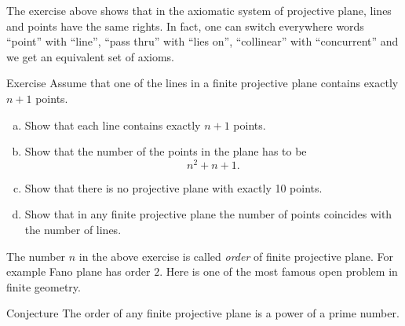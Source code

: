 The exercise above shows that in the axiomatic system of projective plane,
lines and points have the same rights.
In fact, one can switch everywhere words ``point'' with ``line'', ``pass thru'' with ``lies on'', ``collinear'' with ``concurrent'' and we get an equivalent set of axioms.

\begin{thm}{Exercise}\label{ex:oder}
Assume that one of the lines in a finite projective plane contains exactly $n+1$ points.
\begin{enumerate}[(a)]
\item\label{ex:oder:a} Show that each line contains exactly $n+1$ points.
\item\label{ex:oder:b} Show that the number of the points in the plane has to be 
\[n^2+n+1.\]
\item\label{ex:oder:c} Show that there is no projective plane with exactly 10 points.
\item\label{ex:oder:d} Show that in any finite projective plane the number of points coincides with the number of lines.
\end{enumerate}
\end{thm}

The number $n$ in the above exercise is called \emph{order} of finite projective plane.
For example Fano plane has order $2$.
Here is one of the most famous open problem in finite geometry.

\begin{thm}{Conjecture}
The order of any finite projective plane is a power of a prime number.
\end{thm}

